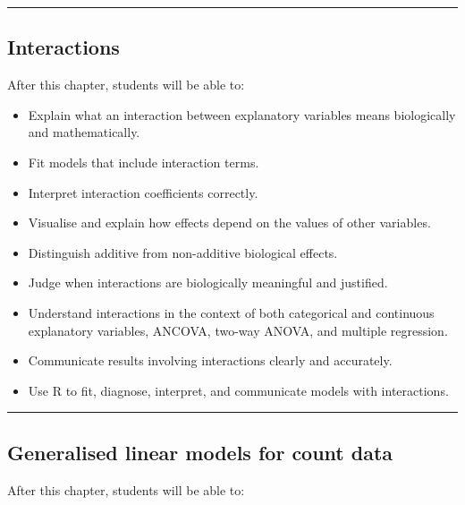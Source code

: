 \documentclass[
  letterpaper,
  8pt,
  a4paper]{book}
\providecommand{\tightlist}{%
  \setlength{\itemsep}{0pt}\setlength{\parskip}{0pt}}
\begin{document}
\begin{center}\rule{0.5\linewidth}{0.5pt}\end{center}

\subsection*{Interactions}\label{interactions}

After this chapter, students will be able to:

\begin{itemize}
\tightlist
\item
  Explain what an interaction between explanatory variables means
  biologically and mathematically.
\item
  Fit models that include interaction terms.
\item
  Interpret interaction coefficients correctly.
\item
  Visualise and explain how effects depend on the values of other
  variables.
\item
  Distinguish additive from non-additive biological effects.
\item
  Judge when interactions are biologically meaningful and justified.
\item
  Understand interactions in the context of both categorical and
  continuous explanatory variables, ANCOVA, two-way ANOVA, and multiple
  regression.
\item
  Communicate results involving interactions clearly and accurately.
\item
  Use R to fit, diagnose, interpret, and communicate models with
  interactions.
\end{itemize}

\begin{center}\rule{0.5\linewidth}{0.5pt}\end{center}

\subsection*{Generalised linear models for count
data}\label{generalised-linear-models-for-count-data}

After this chapter, students will be able to:
\end{document}
